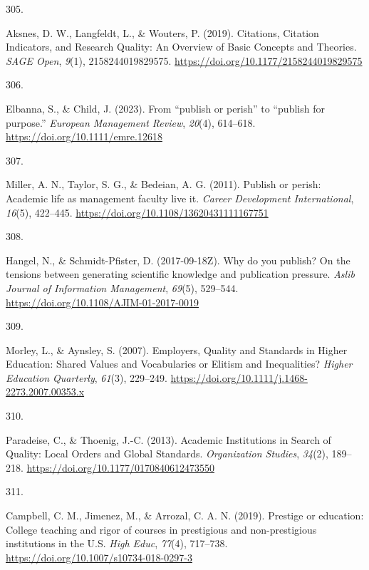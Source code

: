 \documentclass[
  11pt,
  letterpaper,
]{scrreprt}
\newlength{\cslhangindent}
\newlength{\csllabelwidth}
\newenvironment{CSLReferences}[2] %
 {\begin{list}{}{%
  \setlength{\itemindent}{0pt}
  \setlength{\leftmargin}{0pt}
  \setlength{\parsep}{0pt}
  \ifodd #1
   \setlength{\leftmargin}{\cslhangindent}
   \setlength{\itemindent}{-1\cslhangindent}
  \fi
  \setlength{\itemsep}{#2\baselineskip}}}
 {\end{list}}
\newcommand{\CSLLeftMargin}[1]{\parbox[t]{\csllabelwidth}{\strut#1\strut}}
\newcommand{\CSLRightInline}[1]{\parbox[t]{\linewidth - \csllabelwidth}{\strut#1\strut}}
\begin{document}
\begin{CSLReferences}{0}{0}
\CSLLeftMargin{305. }%
\CSLRightInline{Aksnes, D. W., Langfeldt, L., \& Wouters, P. (2019).
Citations, {Citation Indicators}, and {Research Quality}: {An Overview}
of {Basic Concepts} and {Theories}. \emph{SAGE Open}, \emph{9}(1),
2158244019829575. \url{https://doi.org/10.1177/2158244019829575}}

\CSLLeftMargin{306. }%
\CSLRightInline{Elbanna, S., \& Child, J. (2023). From {``publish or
perish''} to {``publish for purpose.''} \emph{European Management
Review}, \emph{20}(4), 614--618.
\url{https://doi.org/10.1111/emre.12618}}

\CSLLeftMargin{307. }%
\CSLRightInline{Miller, A. N., Taylor, S. G., \& Bedeian, A. G. (2011).
Publish or perish: Academic life as management faculty live it.
\emph{Career Development International}, \emph{16}(5), 422--445.
\url{https://doi.org/10.1108/13620431111167751}}

\CSLLeftMargin{308. }%
\CSLRightInline{Hangel, N., \& Schmidt-Pfister, D. (2017-09-18Z). Why do
you publish? {On} the tensions between generating scientific knowledge
and publication pressure. \emph{Aslib Journal of Information
Management}, \emph{69}(5), 529--544.
\url{https://doi.org/10.1108/AJIM-01-2017-0019}}

\CSLLeftMargin{309. }%
\CSLRightInline{Morley, L., \& Aynsley, S. (2007). Employers, {Quality}
and {Standards} in {Higher Education}: {Shared Values} and
{Vocabularies} or {Elitism} and {Inequalities}? \emph{Higher Education
Quarterly}, \emph{61}(3), 229--249.
\url{https://doi.org/10.1111/j.1468-2273.2007.00353.x}}

\CSLLeftMargin{310. }%
\CSLRightInline{Paradeise, C., \& Thoenig, J.-C. (2013). Academic
{Institutions} in {Search} of {Quality}: {Local Orders} and {Global
Standards}. \emph{Organization Studies}, \emph{34}(2), 189--218.
\url{https://doi.org/10.1177/0170840612473550}}

\CSLLeftMargin{311. }%
\CSLRightInline{Campbell, C. M., Jimenez, M., \& Arrozal, C. A. N.
(2019). Prestige or education: College teaching and rigor of courses in
prestigious and non-prestigious institutions in the {U}.{S}. \emph{High
Educ}, \emph{77}(4), 717--738.
\url{https://doi.org/10.1007/s10734-018-0297-3}}


\end{CSLReferences}
\end{document}
